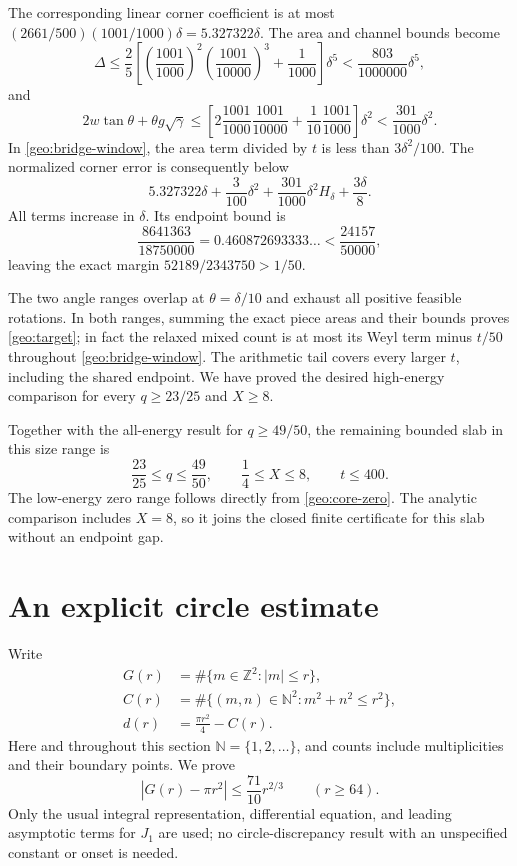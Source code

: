 \documentclass[11pt,reqno]{amsart}
\numberwithin{equation}{section}
\begin{document}
The corresponding linear corner coefficient is at most
$(2661/500)(1001/1000)\delta=5.327322\delta$.  The area and channel
bounds become
\[
 \Delta\le\frac25\left[
        \left(\frac{1001}{1000}\right)^2
        \left(\frac{1001}{10000}\right)^3+\frac1{1000}\right]\delta^5
             <\frac{803}{1000000}\delta^5,
\]
and
\[
 2w\tan\theta+\theta g\sqrt\gamma
 \le\left[2\frac{1001}{1000}\frac{1001}{10000}
                          +\frac1{10}\frac{1001}{1000}\right]\delta^2
                   <\frac{301}{1000}\delta^2.
\]
In \eqref{geo:bridge-window}, the area term divided by $t$ is less than
$3\delta^2/100$.  The normalized corner error is consequently below
\[
 5.327322\delta+\frac3{100}\delta^2
                    +\frac{301}{1000}\delta^2H_\delta+\frac{3\delta}{8}.
\]
All terms increase in $\delta$.  Its endpoint bound is
\[
 \frac{8641363}{18750000}=0.460872693333\ldots
                         <\frac{24157}{50000},
\]
leaving the exact margin $52189/2343750>1/50$.

The two angle ranges overlap at $\theta=\delta/10$ and exhaust all
positive feasible rotations.  In both ranges, summing the exact piece
areas and their bounds proves \eqref{geo:target}; in fact the relaxed
mixed count is at most its Weyl term minus $t/50$ throughout
\eqref{geo:bridge-window}.  The arithmetic tail covers every larger
$t$, including the shared endpoint.  We have proved the desired
high-energy comparison for every $q\ge23/25$ and $X\ge8$.

Together with the all-energy result for $q\ge49/50$, the remaining
bounded slab in this size range is
\[
 \frac{23}{25}\le q\le\frac{49}{50},\qquad
 \frac14\le X\le8,\qquad t\le400.
\]
The low-energy zero range follows directly from \eqref{geo:core-zero}.
The analytic comparison includes $X=8$, so it joins the closed finite
certificate for this slab without an endpoint gap.

\section{An explicit circle estimate}\label{app:circle}

Write
\[
  \begin{aligned}
  G(r)&=\#\{m\in\mathbb Z^2:|m|\le r\},\\
  C(r)&=\#\{(m,n)\in\mathbb N^2:m^2+n^2\le r^2\},\\
  d(r)&=\frac{\pi r^2}{4}-C(r).
  \end{aligned}
\]
Here and throughout this section $\mathbb N=\{1,2,\ldots\}$, and
counts include multiplicities and their boundary points.  We prove
\begin{equation}\label{arith:circle-bound}
 |G(r)-\pi r^2|\le\frac{71}{10}r^{2/3}\qquad(r\ge64).
\end{equation}
Only the usual integral representation, differential equation, and
leading asymptotic terms for $J_1$ are used; no circle-discrepancy result
with an unspecified constant or onset is needed.
\end{document}
